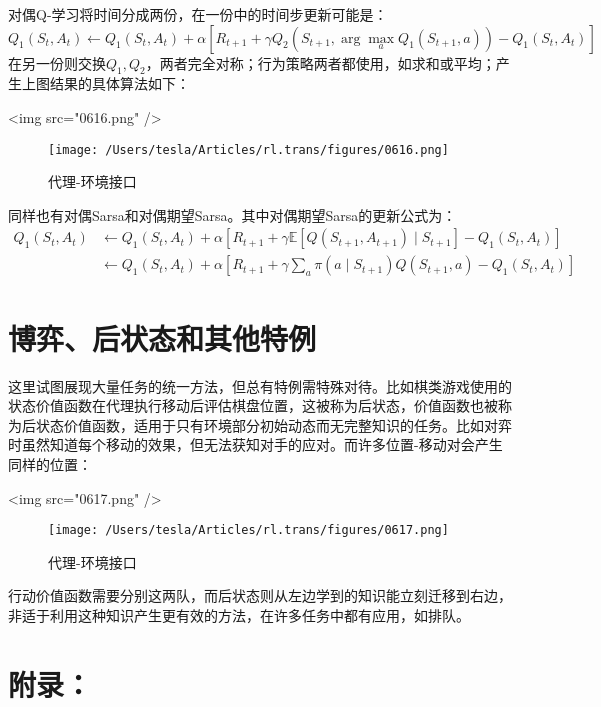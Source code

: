 \documentclass{ctexart}
\begin{document}
对偶Q-学习将时间分成两份，在一份中的时间步更新可能是：
\begin{equation}
Q_1(S_t,A_t) \leftarrow Q_1(S_t,A_t) + \alpha\left[ R_{t+1}+\gamma Q_2\left( S_{t+1},\arg\max_aQ_1(S_{t+1},a) \right) -Q_1(S_t,A_t) \right]
\end{equation}
在另一份则交换$Q_1,Q_2$，两者完全对称；行为策略两者都使用，如求和或平均；产生上图结果的具体算法如下：

<img src="0616.png" />
\begin{figure}[htbp]
    \centering
    \texttt{[image: /Users/tesla/Articles/rl.trans/figures/0616.png]}
    \caption{代理-环境接口}
    \label{fig:0616} 
\end{figure}

同样也有对偶Sarsa和对偶期望Sarsa。其中对偶期望Sarsa的更新公式为：
\begin{align*}
Q_1(S_t,A_t) &\leftarrow Q_1(S_t,A_t) + \alpha\left[ R_{t+1}+\gamma\mathbb E[Q(S_{t+1},A_{t+1})\mid S_{t+1}] -Q_1(S_t,A_t) \right]\\
&\leftarrow Q_1(S_t,A_t) + \alpha\left[ R_{t+1}+\gamma\sum_a\pi(a\mid S_{t+1})Q(S_{t+1},a) -Q_1(S_t,A_t) \right]
\end{align*}

\section{博弈、后状态和其他特例}

这里试图展现大量任务的统一方法，但总有特例需特殊对待。比如棋类游戏使用的状态价值函数在代理执行移动后评估棋盘位置，这被称为后状态，价值函数也被称为后状态价值函数，适用于只有环境部分初始动态而无完整知识的任务。比如对弈时虽然知道每个移动的效果，但无法获知对手的应对。而许多位置-移动对会产生同样的位置：

<img src="0617.png" />
\begin{figure}[htbp]
    \centering
    \texttt{[image: /Users/tesla/Articles/rl.trans/figures/0617.png]}
    \caption{代理-环境接口}
    \label{fig:0617} 
\end{figure}

行动价值函数需要分别这两队，而后状态则从左边学到的知识能立刻迁移到右边，非适于利用这种知识产生更有效的方法，在许多任务中都有应用，如排队。



\section{附录：}
\end{document}
